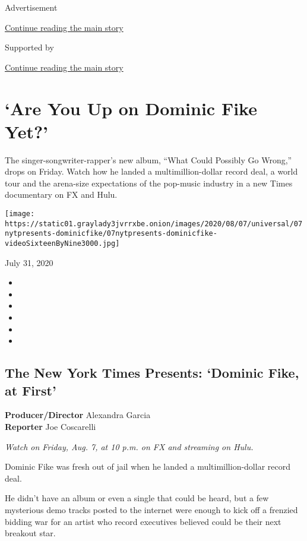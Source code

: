 Advertisement

\protect\hyperlink{after-top}{Continue reading the main story}

Supported by

\protect\hyperlink{after-sponsor}{Continue reading the main story}

\hypertarget{are-you-up-on-dominic-fike-yet}{%
\section{`Are You Up on Dominic Fike
Yet?'}\label{are-you-up-on-dominic-fike-yet}}

The singer-songwriter-rapper's new album, ``What Could Possibly Go
Wrong,'' drops on Friday. Watch how he landed a multimillion-dollar
record deal, a world tour and the arena-size expectations of the
pop-music industry in a new Times documentary on FX and Hulu.

\texttt{[image: https://static01.graylady3jvrrxbe.onion/images/2020/08/07/universal/07nytpresents-dominicfike/07nytpresents-dominicfike-videoSixteenByNine3000.jpg]}

July 31, 2020

\begin{itemize}
\item
\item
\item
\item
\item
\item
\end{itemize}

\hypertarget{the-new-york-times-presents-dominic-fike-at-first}{%
\subsection{The New York Times Presents: `Dominic Fike, at
First'}\label{the-new-york-times-presents-dominic-fike-at-first}}

\textbf{Producer/Director} Alexandra Garcia\\
\textbf{Reporter} Joe Coscarelli

\emph{Watch on Friday, Aug. 7, at 10 p.m. on FX and streaming on Hulu.}

Dominic Fike was fresh out of jail when he landed a multimillion-dollar
record deal.

He didn't have an album or even a single that could be heard, but a few
mysterious demo tracks posted to the internet were enough to kick off a
frenzied bidding war for an artist who record executives believed could
be their next breakout star.

